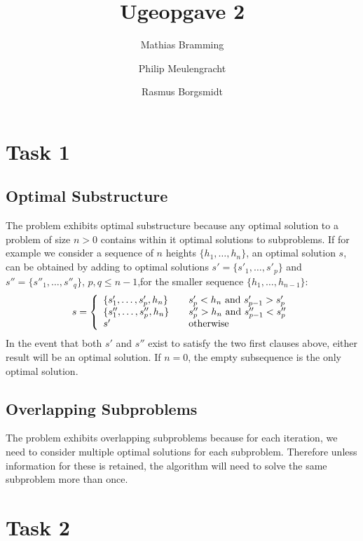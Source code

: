 \documentclass[paper=a4, fleqn]{article}
\title{Ugeopgave 2}
\author{Mathias Bramming \and Philip Meulengracht \and Rasmus Borgsmidt}
\date{}
\begin{document}
\maketitle
\section*{Task 1}

\subsection*{Optimal Substructure}

The problem exhibits optimal substructure because any optimal solution to a
problem of size $n>0$ contains within it optimal solutions to subproblems. If
for example we consider a sequence of $n$ heights $\{h_1,\ldots,h_n\}$, an
optimal solution $s$, can be obtained by adding to optimal solutions
$s'=\{s'_1,\ldots,s'_p\}$ and $s''=\{s''_1,\ldots,s''_q\}$, $p,q\leq n-1$,for the
smaller sequence $\{h_1,\ldots,h_{n-1}\}$:
\[
s = \left\{
  \begin{array}{l l}
    \{s'_1,\ldots,s'_p, h_n\}& \quad \text{$s'_p<h_n$ and $s'_{p-1}>s'_p$}\\
    \{s''_1,\ldots,s''_p, h_n\}& \quad \text{$s''_p>h_n$ and $s''_{p-1}<s''_p$}\\
    s' & \quad \text{otherwise}
  \end{array} \right.
\]
In the event that both $s'$ and $s''$ exist to satisfy the two first clauses
above, either result will be an optimal solution. If $n=0$, the empty
subsequence is the only optimal solution.

\subsection*{Overlapping Subproblems}

The problem exhibits overlapping subproblems because for each iteration, we need
to consider multiple optimal solutions for each subproblem. Therefore unless
information for these is retained, the algorithm will need to solve the same
subproblem more than once.

\clearpage
\section*{Task 2}
\end{document}
